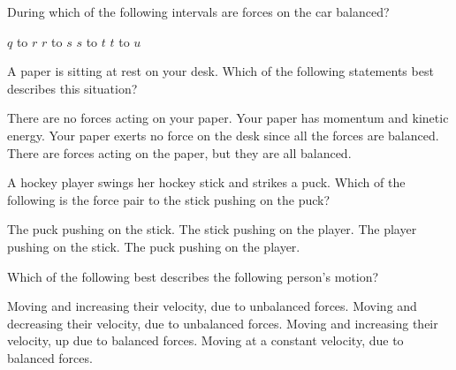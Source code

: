 \documentclass[answers]{exam}
\begin{document}
\begin{questions}
During which of the following intervals are forces on the car balanced?

\begin{randomizeoneparchoices}[norandomize]
    \choice $q$ to $r$
    \correctchoice $r$ to $s$
    \choice $s$ to $t$
    \choice $t$ to $u$
\end{randomizeoneparchoices}

\question 
A paper is sitting at rest on your desk.  Which of the following statements best describes this situation?

\begin{randomizechoices}[norandomize]
    \choice There are no forces acting on your paper.
    \choice Your paper has momentum and kinetic energy.
    \choice Your paper exerts no force on the desk since all the forces are balanced.
    \correctchoice There are forces acting on the paper, but they are all balanced.
\end{randomizechoices}

\question
A hockey player swings her hockey stick and strikes a puck.  Which of the following is the force pair to the stick pushing on the puck?

\begin{randomizechoices}[norandomize]
    \correctchoice The puck pushing on the stick.
    \choice The stick pushing on the player.
    \choice The player pushing on the stick.
    \choice The puck pushing on the player.
\end{randomizechoices}


\question 
Which of the following best describes the following person's motion?


\begin{center}
\end{center}

\begin{randomizechoices}[norandomize]
    \choice Moving and increasing their velocity, due to unbalanced forces.
    \choice Moving and decreasing their velocity, due to unbalanced forces.
    \choice Moving and increasing their velocity, up due to balanced forces.
    \correctchoice Moving at a constant velocity, due to balanced forces.
\end{randomizechoices}


\end{questions}
\end{document}
